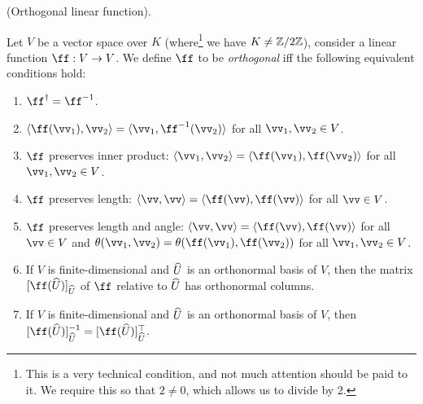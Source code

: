 \begin{defn}
\label{ch::bilinear_forms_metric_tensors::defn::orthogonal_linear_fn}
    (Orthogonal linear function). 
    
    Let $V$ be a vector space over $K$ (where\footnote{This is a very technical condition, and not much attention should be paid to it. We require this so that $2 \neq 0$, which allows us to divide by $2$.} we have $K \neq \mathbb{Z}/2\mathbb{Z}$), consider a linear function $\ff:V \rightarrow V$. We define $\ff$ to be \textit{orthogonal} iff the following equivalent conditions hold:
    
    \begin{enumerate}
        \item $\ff^\dag = \ff^{-1}$.
        \item $\langle \ff(\vv_1), \vv_2 \rangle = \langle \vv_1, \ff^{-1}(\vv_2) \rangle$ for all $\vv_1, \vv_2 \in V$.
        \item $\ff$ preserves inner product: $\langle \vv_1, \vv_2 \rangle = \langle \ff(\vv_1), \ff(\vv_2) \rangle$ for all $\vv_1, \vv_2 \in V$.
        \item $\ff$ preserves length: $\langle \vv, \vv \rangle = \langle \ff(\vv), \ff(\vv) \rangle$ for all $\vv \in V$.
        \item $\ff$ preserves length and angle: $\langle \vv, \vv \rangle = \langle \ff(\vv), \ff(\vv) \rangle$ for all $\vv \in V$ and $\theta(\vv_1, \vv_2) = \theta(\ff(\vv_1), \ff(\vv_2))$ for all $\vv_1, \vv_2 \in V$.
        \item If $V$ is finite-dimensional and $\widehat{U}$ is an orthonormal basis of $V$, then the matrix $[\ff(\hU)]_{\hU}$ of $\ff$ relative to $\widehat{U}$ has orthonormal columns.
        \item If $V$ is finite-dimensional and $\widehat{U}$ is an orthonormal basis of $V$, then $[\ff(\hU)]_{\hU}^{-1} = [\ff(\hU)]_{\hU}^{\top}$.
    \end{enumerate}
\end{defn}
        
